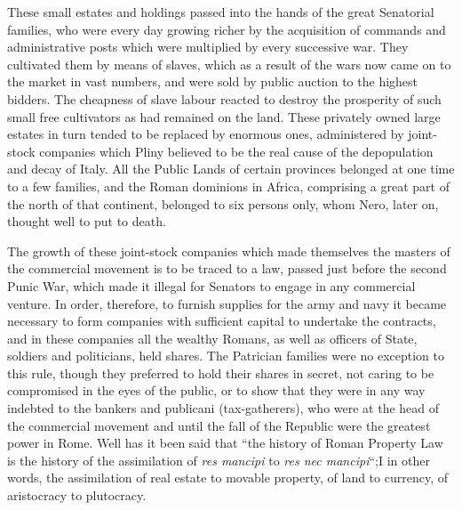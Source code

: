 \documentclass{book}
\begin{document}
These small estates and holdings passed into the hands of the great Senatorial families, who were every day growing richer by the acquisition of commands and administrative posts which were multiplied by every successive war. They cultivated them by means of slaves, which as a result of the wars now came on to the market in vast numbers, and were sold by public auction to the highest bidders. The cheapness of slave labour reacted to destroy the prosperity of such small free cultivators as had remained on the land. These privately owned large estates in turn tended to be replaced by enormous ones, administered by joint-stock companies which Pliny believed to be the real cause of the depopulation and decay of Italy. All the Public Lands of certain provinces belonged at one time to a few families, and the Roman dominions in Africa, comprising a great part of the north of that continent, belonged to six persons only, whom Nero, later on, thought well to put to death.

The growth of these joint-stock companies which made themselves the masters of the commercial movement is to be traced to a law, passed just before the second Punic War, which made it illegal for Senators to engage in any commercial venture. In order, therefore, to furnish supplies for the army and navy it became necessary to form companies with sufficient capital to undertake the contracts, and in these companies all the wealthy Romans, as well as officers of State, soldiers and politicians, held shares. The Patrician families were no exception to this rule, though they preferred to hold their shares in secret, not caring to be compromised in the eyes of the public, or to show that they were in any way indebted to the bankers and publicani (tax-gatherers), who were at the head of the commercial movement and until the fall of the Republic were the greatest power in Rome. Well has it been said that “the history of Roman Property Law is the history of the assimilation of \emph{res mancipi} to \emph{res nec mancipi}“;\footnotemark[4] I in other words, the assimilation of real estate to movable property, of land to currency, of aristocracy to plutocracy.
\end{document}
